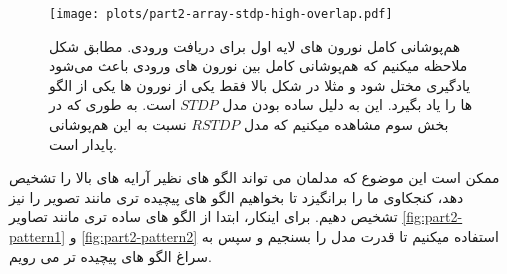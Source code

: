         \begin{figure}[!ht]
            \centering
            \captionsetup{width=.9\linewidth}
            \texttt{[image: plots/part2-array-stdp-high-overlap.pdf]} 
            \caption{هم‌پوشانی کامل نورون های لایه اول برای دریافت ورودی. مطابق شکل ملاحظه میکنیم که هم‌پوشانی کامل بین نورون های ورودی باعث می‌شود یادگیری مختل شود و مثلا در شکل بالا فقط یکی از نورون ها یکی از الگو ها را یاد بگیرد. این به دلیل ساده بودن مدل 
            $STDP$ 
            است. به طوری که در بخش سوم مشاهده میکنیم که مدل 
            $RSTDP$ 
            نسبت به این هم‌پوشانی پایدار است.
            }
            \label{fig:part2-array-stdp-high-overlap}
        \end{figure}
        ممکن است این موضوع که مدلمان می تواند الگو های نظیر آرایه های بالا را تشخیص دهد، کنجکاوی ما را برانگیزد تا بخواهیم الگو های پیچیده تری مانند تصویر را نیز تشخیص دهیم. برای اینکار، ابتدا از الگو های ساده تری مانند تصاویر 
        \ref{fig:part2-pattern1} و 
        \ref{fig:part2-pattern2} 
        استفاده میکنیم تا قدرت مدل را بسنجیم و سپس به سراغ الگو های پیچیده تر می رویم.

